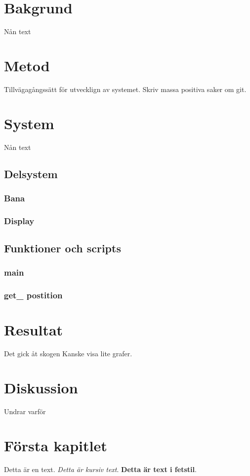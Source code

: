 \documentclass[10pt,oneside,swedish]{lips-no_customer}
\begin{document}
\clearpage


\cleardoublepage

\section{Bakgrund}
Nån text

\section{Metod}
Tillvägagångssätt för utvecklign av systemet. Skriv massa positiva saker om git.
\section{System}
 Nån text
	\subsection{Delsystem}
		\subsubsection{Bana}
		\subsubsection{Display}
	\subsection{Funktioner och scripts}
		\subsubsection{main}
		\subsubsection{get\_ postition}

\section{Resultat}
Det gick åt skogen
Kanske visa lite grafer.

\section{Diskussion}
Undrar varför

\section{Första kapitlet}
Detta är en text. \emph{Detta är kursiv text}. \textbf{Detta är text i
  fetstil}.
\end{document}
